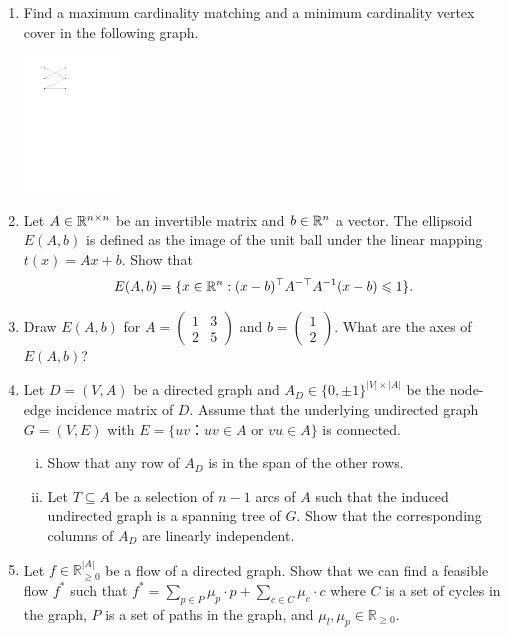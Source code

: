 \documentclass[11pt]{article}
\institute{\'Ecole Polytechnique F\'ed\'erale de Lausanne}
\renewcommand{\leq}{\leqslant}
\renewcommand{\geq}{\geqslant}
\begin{document}
\makeheader

\begin{enumerate}[1)]
\item Find a maximum cardinality matching and a minimum cardinality vertex cover in the following graph.
  \begin{center}
    \includegraphics[width=0.2\textwidth]{graph1}
  \end{center}
\item 
Let $A \in \mathbb{R}^{n \times n}$ be an invertible matrix and $b \in \mathbb{R}^{n}$ a vector. The ellipsoid $E(A,b)$ is defined as the image of the unit ball under the linear mapping $t(x) = Ax+b$. Show that
$$E(A,b) = \{ x \in \R^n: (x-b)^\top A^{-\top} A^{-1} (x-b) \leq 1 \}.$$
	
\item 
Draw $E(A,b)$ for $A = \begin{pmatrix} 1 & 3  \\ 2 & 5 \end{pmatrix}$ and $b  = \begin{pmatrix} 1   \\ 2 \end{pmatrix}$. What are the axes of $E(A,b)$?

\item Let $D = (V,A)$  be a directed graph and $A_D ∈ \{0,\pm1\}^{|V| × |A|}$ be the node-edge incidence matrix of $D$. Assume that the underlying undirected graph $G = (V,E)$  with $E = \{ uv ： uv ∈A \text{ or } vu ∈ A\}$ is connected. 
  \begin{enumerate}[i)]
  \item Show that any row of $A_D$ is in the span of the other rows.
  \item Let $T ⊆ A$ be a selection of $n-1$ arcs of $A$ such that the induced undirected graph is a spanning tree of $G$. Show that the corresponding columns of $A_D$ are linearly independent.
  \end{enumerate}
  
  
  
\item Let $f \in \mathbb{R}^{|A|}_{\geq 0}$ be a flow of a directed graph. Show that we can find a feasible flow $f^*$ such that $f^* = \sum_{p \in P}  \mu_p \cdot p + \sum_{c \in C}\mu_c \cdot c$ where $C$ is a set of cycles in the graph, $P$ is a set of paths in the graph, and $\mu_l, \mu_p \in \mathbb{R}_{\geq 0}$.


\end{enumerate}
\end{document}
